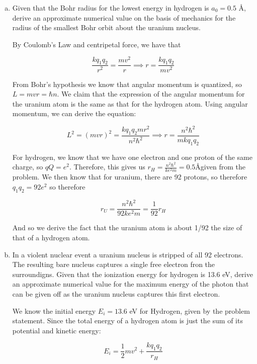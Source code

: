 \documentclass[10pt]{article}
\begin{document}
    \begin{enumerate}[(a)]
        \item Given that the Bohr radius for the lowest energy in hydrogen is $a_0 = 0.5$ \AA, derive an approximate numerical value on the basis of mechanics for the radius of the smallest Bohr orbit about the uranium nucleus.
        
        \begin{solution}
            By Coulomb's Law and centripetal force, we have that 

            \[ \frac{kq_1q_2}{r^2} = \frac{mv^2}{r} \implies r = \frac{kq_1q_2}{mv^2}\]

            From Bohr's hypothesis we know that angular momentum is quantized, so $L = mvr = \hbar n$. We claim that the expression of the angular momentum for the uranium atom is the same as that for the hydrogen atom. Using angular momentum, we can derive the equation: 

            \[ L^2 = (mvr)^2 = \frac{kq_1q_2mr^2}{n^2\hbar^2} \implies r = \frac{n^2 \hbar^2}{m kq_1q_2}\]

            For hydrogen, we know that we have one electron and one proton of the same charge, so $qQ = e^2$. Therefore, this gives us $r_H = \frac{n^2\hbar^2}{ke^2m} = 0.5$\AA  given from the problem. We then know that for uranium, there are 92 protons, so therefore $q_1q_2 = 92e^2$ so therefore 

            \[ r_U = \frac{n^2\hbar^2}{92ke^2m} = \frac{1}{92}r_H\]

            And so we derive the fact that the uranium atom is about 1/92 the size of that of a hydrogen atom. 
        \end{solution}
        \item In a violent nuclear event a uranium nucleus is stripped of all 92 electrons. The resulting bare nucleus captures a single free electron fron the surroundigns. Given that the ionization energy for hydrogen is 13.6 eV, derive an approximate numerical value for the maximum energy of the photon that can be given off as the uranium nucleus captures this first electron.
        
        \begin{solution}
            We know the initial energy $E_i = 13.6$ eV for Hydrogen, given by the problem statement. Since the total energy of a hydrogen atom is just the sum of its potential and kinetic energy: 

            \[ E_i = \frac{1}{2}mv^2 + \frac{kq_1q_2}{r_H}\] 


\end{solution}
\end{enumerate}
\end{document}
